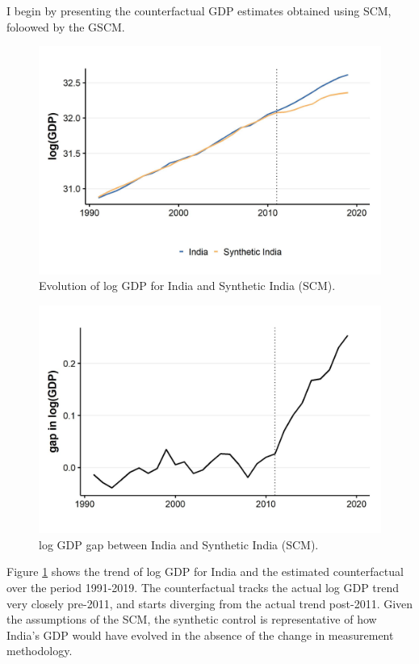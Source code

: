 \documentclass[12pt,nobind, a4paper]{reedthesis}
\begin{document}
 I begin by presenting the counterfactual GDP estimates obtained using SCM, foloowed by the GSCM.
 \newpage
 \begin{figure}

 {\centering \includegraphics[width=1\linewidth]{figure/indiasynth} 

 }

 \caption{Evolution of log GDP for India and Synthetic India (SCM).}\label{fig:indsyn}
 \end{figure}
 \begin{figure}

 {\centering \includegraphics[width=1\linewidth]{figure/indiasynthgap} 

 }

 \caption{log GDP gap between India and Synthetic India (SCM).}\label{fig:indsyngap}
 \end{figure}
 Figure \ref{fig:indsyn} shows the trend of log GDP for India and the estimated counterfactual over the period 1991-2019. The counterfactual tracks the actual log GDP trend very closely pre-2011, and starts diverging from the actual trend post-2011. Given the assumptions of the SCM, the synthetic control is representative of how India's GDP would have evolved in the absence of the change in measurement methodology.
 \linebreak
\end{document}
